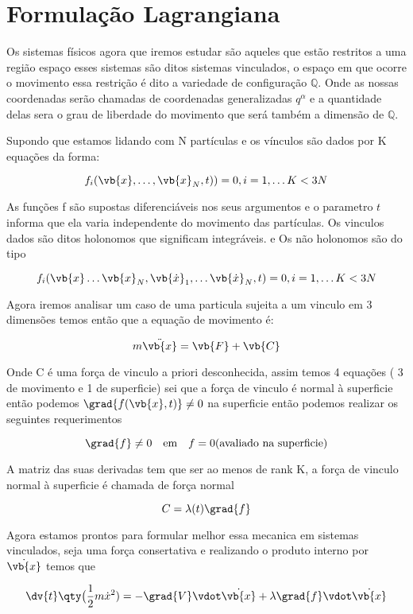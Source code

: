 \documentclass{article}
\begin{document}
\section{Formulação Lagrangiana}

Os sistemas físicos agora que iremos estudar são aqueles que estão restritos a uma região espaço esses sistemas são ditos sistemas vinculados, o espaço em que ocorre o movimento essa restrição é dito a variedade de configuração $\mathbb{Q}$. Onde as nossas coordenadas serão chamadas de coordenadas generalizadas $q^\alpha$ e a quantidade delas sera o grau de liberdade do movimento que será também a dimensão de $\mathbb{Q}$.

Supondo que estamos lidando com N partículas e os vínculos são dados por K equações da forma:

$$f_i(\vb{x}, \dots ,\vb{x}_N,t))=0 , i=1 , \dots K <3N$$


As funções f são supostas diferenciáveis nos seus argumentos e o parametro $t$ informa que ela varia independente do movimento das partículas. Os vinculos dados são ditos holonomos que significam integráveis. e Os não holonomos são do tipo

$$f_i(\vb{x} \dots \vb{x}_N,\vb{\dot{x}}_1,\dots\vb{\dot{x}}_N,t)=0 , i=1 , \dots K <3N$$



Agora iremos analisar um caso de uma particula sujeita a um vinculo em 3 dimensões temos então que a equação de movimento é: 

$$m\ddot{\vb{x}}= \vb{F}+\vb{C}$$

Onde C é uma força de vinculo a priori desconhecida, assim temos 4 equações ( 3 de movimento e 1 de superficie) sei que a força de vinculo é normal à superficie então podemos $\grad{f(\vb{x},t)}\neq 0$ na superficie então podemos realizar os seguintes requerimentos 

$$\grad{f} \neq 0 \quad \text{em} \quad f=0 (\text{avaliado na superficie})$$

A matriz das suas derivadas tem que ser ao menos de rank K, a força de vinculo normal à superficie é chamada de força normal 

$$C=\lambda(t) \grad{f}$$


Agora estamos prontos para formular melhor essa mecanica em sistemas vinculados, seja uma força consertativa e realizando o produto interno por $\dot{\vb{x}}$ temos que

$$\dv{t}\qty\big(\frac{1}{2}m \dot{x}^2)= -\grad{V} \vdot \dot{\vb{x}}+ \lambda \grad{f} \vdot \dot{\vb{x}}$$
\end{document}
